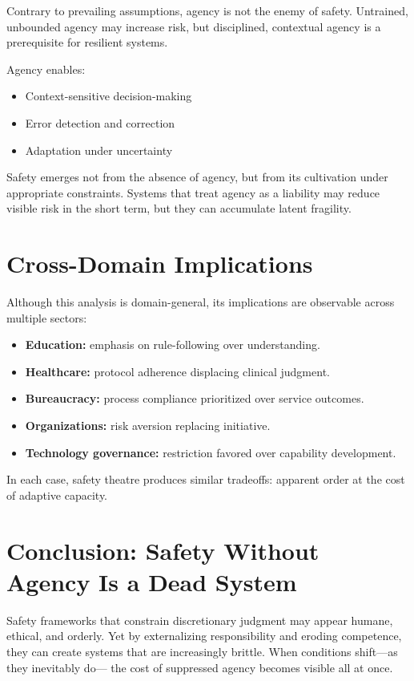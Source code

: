 \documentclass[11pt]{article}
\begin{document}
Contrary to prevailing assumptions, agency is not the enemy of safety. Untrained,
unbounded agency may increase risk, but disciplined, contextual agency is a prerequisite
for resilient systems.

Agency enables:

\begin{itemize}
  \item Context-sensitive decision-making
  \item Error detection and correction
  \item Adaptation under uncertainty
\end{itemize}

Safety emerges not from the absence of agency, but from its cultivation under
appropriate constraints. Systems that treat agency as a liability may reduce visible
risk in the short term, but they can accumulate latent fragility.

\section{Cross-Domain Implications}

Although this analysis is domain-general, its implications are observable across
multiple sectors:

\begin{itemize}
  \item \textbf{Education:} emphasis on rule-following over understanding.
  \item \textbf{Healthcare:} protocol adherence displacing clinical judgment.
  \item \textbf{Bureaucracy:} process compliance prioritized over service outcomes.
  \item \textbf{Organizations:} risk aversion replacing initiative.
  \item \textbf{Technology governance:} restriction favored over capability development.
\end{itemize}

In each case, safety theatre produces similar tradeoffs: apparent order at the cost of
adaptive capacity.

\section{Conclusion: Safety Without Agency Is a Dead System}

Safety frameworks that constrain discretionary judgment may appear humane, ethical, and
orderly. Yet by externalizing responsibility and eroding competence, they can create
systems that are increasingly brittle. When conditions shift---as they inevitably do---
the cost of suppressed agency becomes visible all at once.
\end{document}
